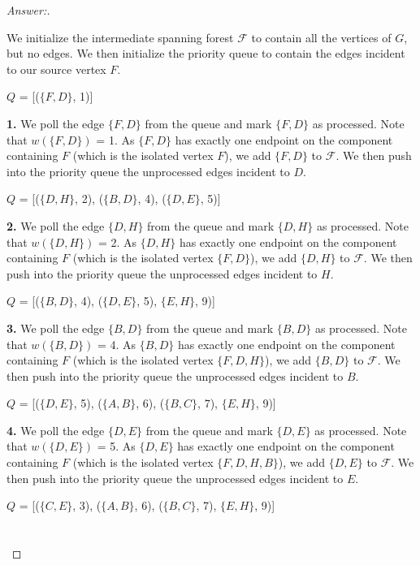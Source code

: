 \documentclass[11pt]{article}
\theoremstyle{definition}
\theoremstyle{definition}
\theoremstyle{definition}
\begin{document}
\begin{proof}[Answer:] \

\item We initialize the intermediate spanning forest $\mathcal{F}$ to contain all the vertices of $G$, but no edges. We then initialize the priority queue to contain the edges incident to our source vertex $F$.
\item $Q$ = [($\{F, D\}$, 1)] \\

\item \textbf{1.} We poll the edge $\{F, D\}$ from the queue and mark $\{F, D\}$ as processed. Note that $w(\{F, D\})$ = 1. As $\{F, D\}$ has exactly one endpoint on the component containing $F$ (which is the isolated vertex $F$), we add $\{F, D\}$ to $\mathcal{F}$. We then push into the priority queue the unprocessed edges incident to $D$.
\item $Q$ = [($\{D, H\}$, 2), ($\{B, D\}$, 4), ($\{D, E\}$, 5)] \\

\item \textbf{2.} We poll the edge $\{D, H\}$ from the queue and mark $\{D, H\}$ as processed. Note that $w(\{D, H\})$ = 2. As $\{D, H\}$ has exactly one endpoint on the component containing $F$ (which is the isolated vertex $\{F, D\}$), we add $\{D, H\}$ to $\mathcal{F}$. We then push into the priority queue the unprocessed edges incident to $H$.
\item $Q$ = [($\{B, D\}$, 4), ($\{D, E\}$, 5), $\{E, H\}$, 9)] \\

\item \textbf{3.} We poll the edge $\{B, D\}$ from the queue and mark $\{B, D\}$ as processed. Note that $w(\{B, D\})$ = 4. As $\{B, D\}$ has exactly one endpoint on the component containing $F$ (which is the isolated vertex $\{F, D, H\}$), we add $\{B, D\}$ to $\mathcal{F}$. We then push into the priority queue the unprocessed edges incident to $B$.
\item $Q$ = [($\{D, E\}$, 5), ($\{A, B\}$, 6), ($\{B, C\}$, 7), $\{E, H\}$, 9)] \\

\item \textbf{4.} We poll the edge $\{D, E\}$ from the queue and mark $\{D, E\}$ as processed. Note that $w(\{D, E\})$ = 5. As $\{D, E\}$ has exactly one endpoint on the component containing $F$ (which is the isolated vertex $\{F, D, H, B\}$), we add $\{D, E\}$ to $\mathcal{F}$. We then push into the priority queue the unprocessed edges incident to $E$.
\item $Q$ = [($\{C, E\}$, 3), ($\{A, B\}$, 6), ($\{B, C\}$, 7), $\{E, H\}$, 9)] \\ \\ \\


\end{proof}
\end{document}
